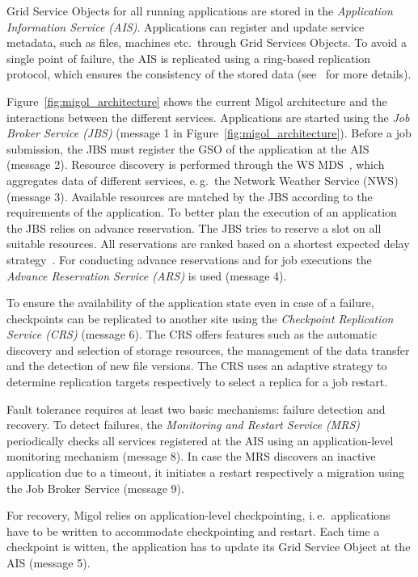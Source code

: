 \documentclass[times, 10pt,twocolumn]{article}
\begin{document}
Grid Service Objects for all running applications are stored in 
the {\em Application Information Service (AIS)}. 
Applications can register and update service metadata, 
such as files, machines etc.\ through Grid Services Objects. 
To avoid a single point of failure, the AIS is replicated using a ring-based
replication protocol, which ensures  the consistency of the stored data
(see~\cite{Luckow:2008ys} for more details).

Figure~\ref{fig:migol_architecture} shows the current Migol architecture and
the interactions between the different services.  Applications are
started using the {\em Job Broker Service (JBS)} (message 1 in 
Figure~\ref{fig:migol_architecture}). Before a job
submission, the JBS must register the GSO of the application at the AIS (message 2).
Resource discovery is performed through the WS MDS~\cite{schopf06},
which aggregates data of different services, e.\,g.\ the Network
Weather Service (NWS)~\cite{NWS99} (message 3).  Available resources are matched
by the JBS according to the requirements of the application. To better plan the execution of 
an application the JBS relies on advance reservation. The JBS tries to reserve a slot on all suitable
resources. All reservations are ranked based on a shortest expected
delay strategy~\cite{Jeske:2007wj}.  For conducting advance reservations and for job executions the
\emph{Advance Reservation Service (ARS)} is used (message 4).
             
To ensure the availability of the application state even in case of a failure, 
checkpoints can be replicated to another site  using the \emph{Checkpoint Replication Service
(CRS)} (message 6).  The CRS offers features such as the automatic discovery and selection of storage resources, 
the management of the data transfer and the detection of new file versions. 
The CRS uses an adaptive strategy to determine replication  targets respectively to select a replica for a
job restart.


Fault tolerance requires at least two basic mechanisms: failure
detection and recovery. To detect failures, the \emph{Monitoring and Restart Service (MRS)}
periodically checks all services registered at the AIS using an
application-level monitoring mechanism (message 8). In case the MRS discovers an inactive
application due to a timeout, it initiates a restart respectively a migration using the
Job Broker Service (message 9).  
          
For recovery, Migol relies on 
application-level checkpointing, i.\,e.\ applications have to be
written to accommodate checkpointing and restart. 
Each time a checkpoint is witten, the application has to update
its Grid Service Object at the AIS (message 5). 
\end{document}
